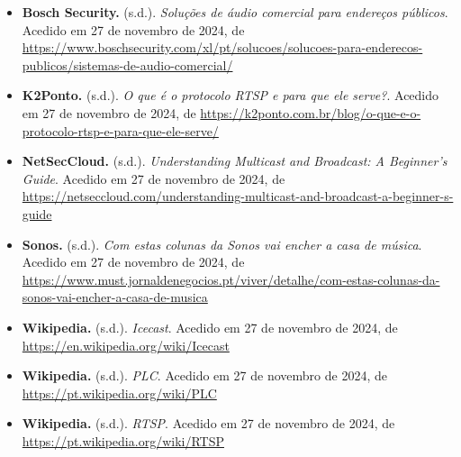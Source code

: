 \documentclass{article}
\begin{document}
\begin{itemize}
    \item \textbf{Bosch Security.} (s.d.). \textit{Soluções de áudio comercial para endereços públicos}. Acedido em 27 de novembro de 2024, de \url{https://www.boschsecurity.com/xl/pt/solucoes/solucoes-para-enderecos-publicos/sistemas-de-audio-comercial/}
    
    \item \textbf{K2Ponto.} (s.d.). \textit{O que é o protocolo RTSP e para que ele serve?}. Acedido em 27 de novembro de 2024, de \url{https://k2ponto.com.br/blog/o-que-e-o-protocolo-rtsp-e-para-que-ele-serve/}
    
    \item \textbf{NetSecCloud.} (s.d.). \textit{Understanding Multicast and Broadcast: A Beginner’s Guide}. Acedido em 27 de novembro de 2024, de \url{https://netseccloud.com/understanding-multicast-and-broadcast-a-beginner-s-guide}
    
    \item \textbf{Sonos.} (s.d.). \textit{Com estas colunas da Sonos vai encher a casa de música}. Acedido em 27 de novembro de 2024, de \url{https://www.must.jornaldenegocios.pt/viver/detalhe/com-estas-colunas-da-sonos-vai-encher-a-casa-de-musica}
    
    \item \textbf{Wikipedia.} (s.d.). \textit{Icecast}. Acedido em 27 de novembro de 2024, de \url{https://en.wikipedia.org/wiki/Icecast}
    
    \item \textbf{Wikipedia.} (s.d.). \textit{PLC}. Acedido em 27 de novembro de 2024, de \url{https://pt.wikipedia.org/wiki/PLC}
    
    \item \textbf{Wikipedia.} (s.d.). \textit{RTSP}. Acedido em 27 de novembro de 2024, de \url{https://pt.wikipedia.org/wiki/RTSP}
\end{itemize}
\end{document}
